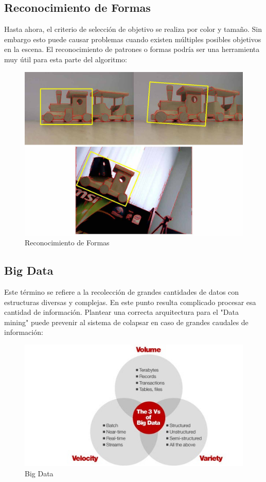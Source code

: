 	\subsection{Reconocimiento de Formas}
	Hasta ahora, el criterio de selecci\'on de objetivo se realiza por color y tama\~no. Sin embargo esto puede causar problemas cuando existen m\'ultiples posibles objetivos en la escena. El reconocimiento de patrones o formas  \cite{color_shape_object_recogn} \cite{Fast_object_recogn_shape} podr\'ia ser una herramienta muy \'util para esta parte del algoritmo:
	
	\begin{figure}[th]
		\centering
		\includegraphics[width=0.6\linewidth]{../Images/c6/shape_recogn}
		\caption{Reconocimiento de Formas}
		\label{fig:shape_recogn}
	\end{figure}
	
	\subsection{Big Data}
	Este t\'ermino se refiere  a la recolecci\'on de grandes cantidades de datos con estructuras diversas y complejas. En este punto resulta complicado procesar esa cantidad de informaci\'on. Plantear una correcta arquitectura para el "Data mining" \cite{Big_data_Ecosystem} \cite{Big_data_mapReduce} puede prevenir al sistema de colapsar en caso de grandes caudales de informaci\'on:
	
	\begin{figure}[th]
		\centering
		\includegraphics[width=0.7\linewidth]{../Images/c6/big_data}
		\caption{Big Data}
		\label{fig:big_data}
	\end{figure}
	
	

